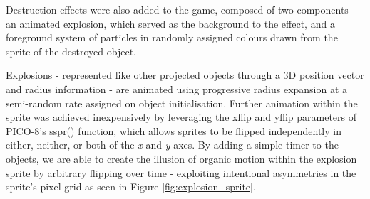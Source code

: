 \documentclass[11pt]{article}
\begin{document}
Destruction effects were also added to the game, composed of two components - an animated explosion, which
served as the background to the effect, and a foreground system of particles in randomly assigned colours
drawn from the sprite of the destroyed object.

Explosions - represented like other projected objects through a 3D position vector and radius information -
are animated using progressive radius expansion at a semi-random rate assigned on object initialisation.
Further animation within the sprite was achieved inexpensively by leveraging the xflip and yflip parameters
of PICO-8's sspr() function, which allows sprites to be flipped independently in either, neither, or both of the
\textit{x} and \textit{y} axes. By adding a simple timer to the objects, we are able to create the illusion of
organic motion within the explosion sprite by arbitrary flipping over time - exploiting intentional asymmetries
in the sprite's pixel grid as seen in Figure \ref{fig:explosion_sprite}.
\end{document}
